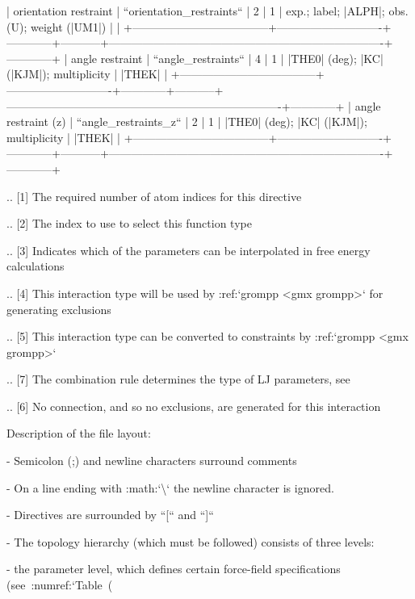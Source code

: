             | orientation restraint              | ``orientation_restraints`` | 2          | 1         | exp.; label; |ALPH|; obs. (U); weight (|UM1|)                           |            |
            +------------------------------------+----------------------------+------------+-----------+-------------------------------------------------------------------------+------------+
            | angle restraint                    | ``angle_restraints``       | 4          | 1         | |THE0| (deg); |KC| (|KJM|); multiplicity                                | |THEK|     | 
            +------------------------------------+----------------------------+------------+-----------+-------------------------------------------------------------------------+------------+
            | angle restraint (z)                | ``angle_restraints_z``     | 2          | 1         | |THE0| (deg); |KC| (|KJM|); multiplicity                                | |THEK|     | 
            +------------------------------------+----------------------------+------------+-----------+-------------------------------------------------------------------------+------------+

.. [1]
   The required number of atom indices for this directive
   
.. [2]
   The index to use to select this function type
   
.. [3]
   Indicates which of the parameters can be interpolated in free energy calculations
   
.. [4]
   This interaction type will be used by :ref:`grompp <gmx grompp>` for generating exclusions
   
.. [5]
   This interaction type can be converted to constraints by :ref:`grompp <gmx grompp>`
   
.. [7]
   The combination rule determines the type of LJ parameters, see
   
.. [6]
   No connection, and so no exclusions, are generated for this interaction

Description of the file layout:

-  Semicolon (;) and newline characters surround comments

-  On a line ending with :math:`\backslash` the newline character is
   ignored.

-  Directives are surrounded by ``[`` and ``]``

-  The topology hierarchy (which must be followed) consists of three
   levels:

   -  the parameter level, which defines certain force-field
      specifications (see :numref:`Table (%

